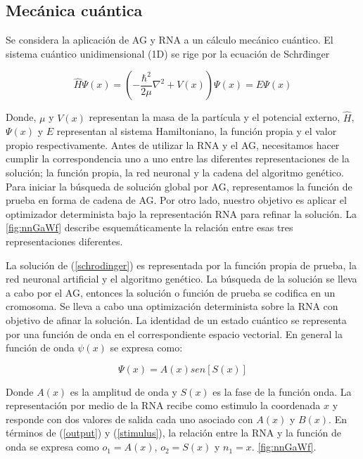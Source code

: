 \subsection{Mec\'anica cu\'antica}

Se considera la aplicaci\'on de AG y RNA a un c\'alculo mec\'anico
cu\'antico. El sistema cu\'antico unidimensional (1D) se rige por
la ecuaci\'on de Schr\"dinger

\begin{equation}
	\widehat{H}\Psi(x)=(-\frac{\hbar^2}{2\mu}\nabla^2+V(x))\Psi(x)=E\Psi(x)
	\label{schrodinger}
\end{equation}

Donde, $\mu$ y $V(x)$ representan la masa de la part\'icula y el
potencial externo, $\widehat{H}$, $\Psi(x)$ y $E$ representan al sistema
Hamiltoniano, la funci\'on propia y el valor propio respectivamente.
Antes de utilizar la RNA y el AG, necesitamos hacer cumplir la correspondencia
uno a uno entre las diferentes representaciones de la soluci\'on; la funci\'on
propia, la red neuronal y la cadena del algoritmo gen\'etico. Para iniciar la b\'usqueda de soluci\'on
global por AG, representamos la funci\'on de prueba en forma de cadena de AG.
Por otro lado, nuestro objetivo es aplicar el optimizador determinista bajo
la representaci\'on RNA para refinar la soluci\'on. La \ref{fig:nnGaWf} describe
esquem\'aticamente la relaci\'on entre esas tres representaciones diferentes.

La soluci\'on de (\ref{schrodinger}) es representada por la funci\'on
propia de prueba, la red neuronal artificial y el algoritmo
gen\'etico. La b\'usqueda de la soluci\'on se lleva a cabo por el
AG, entonces la soluci\'on o funci\'on de prueba se codifica en
un cromosoma. Se lleva a cabo una optimizaci\'on determinista
sobre la RNA con objetivo de afinar la soluci\'on. La identidad
de un estado cu\'antico se representa por una funci\'on de onda
en el correspondiente espacio vectorial. En general la funci\'on
de onda $\psi(x)$ se expresa como: 

\begin{equation}
	\Psi(x)=A(x)sen[S(x)]\label{waveFunc}
\end{equation}

Donde $A(x)$ es la amplitud de onda y $S(x)$ es la fase de la
funci\'on onda. La representaci\'on por medio de la RNA recibe
como estimulo la coordenada $x$ y responde con dos valores
de salida cada uno asociado con $A(x)$ y $B(x)$. En t\'erminos
de (\ref{output}) y (\ref{stimulus}), la relaci\'on entre la RNA y la funci\'on de onda
se expresa como $o_1=A(x)$, $o_2=S(x)$ y $n_1=x$. \ref{fig:nnGaWf}.

